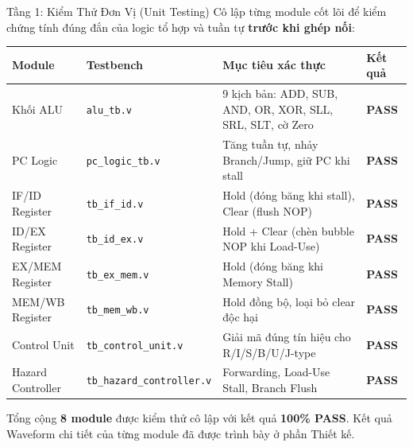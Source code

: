 \begin{frame}{Tầng 1: Kiểm Thử Đơn Vị (Unit Testing)}
    Cô lập từng module cốt lõi để kiểm chứng tính đúng đắn của logic tổ hợp và tuần tự \textbf{trước khi ghép nối}:
    \vspace{0.15cm}

    \begin{table}[]
        \centering
        \scriptsize
        \begin{tabular}{llll}
            \toprule
            \textbf{Module} & \textbf{Testbench} & \textbf{Mục tiêu xác thực} & \textbf{Kết quả} \\
            \midrule
            Khối ALU & \texttt{alu\_tb.v} & 9 kịch bản: ADD, SUB, AND, OR, XOR, SLL, SRL, SLT, cờ Zero & \textcolor{green!60!black}{\textbf{PASS}} \\
            PC Logic & \texttt{pc\_logic\_tb.v} & Tăng tuần tự, nhảy Branch/Jump, giữ PC khi stall & \textcolor{green!60!black}{\textbf{PASS}} \\
            IF/ID Register & \texttt{tb\_if\_id.v} & Hold (đóng băng khi stall), Clear (flush NOP) & \textcolor{green!60!black}{\textbf{PASS}} \\
            ID/EX Register & \texttt{tb\_id\_ex.v} & Hold + Clear (chèn bubble NOP khi Load-Use) & \textcolor{green!60!black}{\textbf{PASS}} \\
            EX/MEM Register & \texttt{tb\_ex\_mem.v} & Hold (đóng băng khi Memory Stall) & \textcolor{green!60!black}{\textbf{PASS}} \\
            MEM/WB Register & \texttt{tb\_mem\_wb.v} & Hold đồng bộ, loại bỏ clear độc hại & \textcolor{green!60!black}{\textbf{PASS}} \\
            Control Unit & \texttt{tb\_control\_unit.v} & Giải mã đúng tín hiệu cho R/I/S/B/U/J-type & \textcolor{green!60!black}{\textbf{PASS}} \\
            Hazard Controller & \texttt{tb\_hazard\_controller.v} & Forwarding, Load-Use Stall, Branch Flush & \textcolor{green!60!black}{\textbf{PASS}} \\
            \bottomrule
        \end{tabular}
    \end{table}

    \vspace{0.1cm}
    \scriptsize
    Tổng cộng \textbf{8 module} được kiểm thử cô lập với kết quả \textbf{100\% PASS}. Kết quả Waveform chi tiết của từng module đã được trình bày ở phần Thiết kế.
\end{frame}

